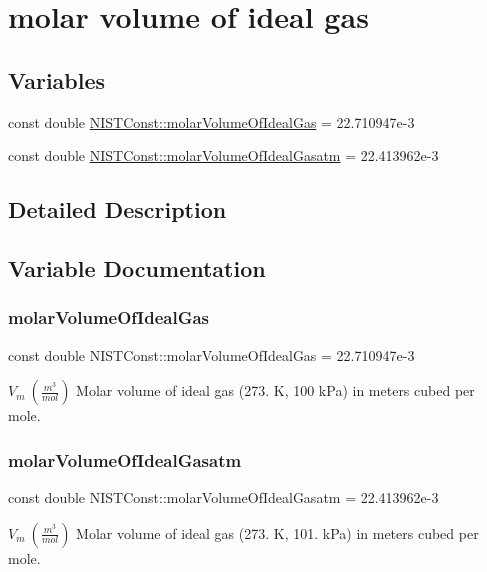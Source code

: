 \hypertarget{group___molar_volume}{}\section{molar volume of ideal gas}
\label{group___molar_volume}
\subsection*{Variables}
\begin{DoxyCompactItemize}
\item 
const double \hyperlink{group___molar_volume_ga666dc78c2b916ed12bcaf3ec15d7c4d3}{N\+I\+S\+T\+Const\+::molar\+Volume\+Of\+Ideal\+Gas} = 22.\+710947e-\/3
\item 
const double \hyperlink{group___molar_volume_ga005e08baa33a25a474bd2287281883c4}{N\+I\+S\+T\+Const\+::molar\+Volume\+Of\+Ideal\+Gasatm} = 22.\+413962e-\/3
\end{DoxyCompactItemize}


\subsection{Detailed Description}


\subsection{Variable Documentation}
\mbox{\label{group___molar_volume_ga666dc78c2b916ed12bcaf3ec15d7c4d3}} 
\subsubsection{\texorpdfstring{molar\+Volume\+Of\+Ideal\+Gas}{molarVolumeOfIdealGas}}
{\footnotesize\ttfamily const double N\+I\+S\+T\+Const\+::molar\+Volume\+Of\+Ideal\+Gas = 22.\+710947e-\/3}

$V_m \ (\frac{m^3}{mol})$ Molar volume of ideal gas (273. K, 100 k\+Pa) in meters cubed per mole. \mbox{\label{group___molar_volume_ga005e08baa33a25a474bd2287281883c4}} 
\subsubsection{\texorpdfstring{molar\+Volume\+Of\+Ideal\+Gasatm}{molarVolumeOfIdealGasatm}}
{\footnotesize\ttfamily const double N\+I\+S\+T\+Const\+::molar\+Volume\+Of\+Ideal\+Gasatm = 22.\+413962e-\/3}

$V_m \ (\frac{m^3}{mol})$ Molar volume of ideal gas (273. K, 101. k\+Pa) in meters cubed per mole. 